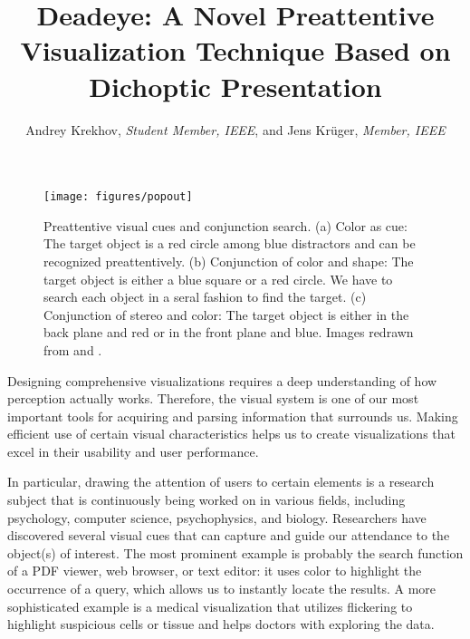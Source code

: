\documentclass[journal]{vgtc}                %
\title{Deadeye: A Novel Preattentive Visualization Technique Based on Dichoptic Presentation}
\author{Andrey Krekhov, \textit{Student Member, IEEE}, and Jens Kr\"uger, \textit{Member, IEEE}}
\begin{document}


\maketitle



\begin{figure*}[t!]
\centering
\texttt{[image: figures/popout]}
\caption{Preattentive visual cues and conjunction search. (a) Color as cue: The target object is a red circle among blue distractors and can be recognized preattentively. (b) Conjunction of color and shape: The target object is either a blue square or a red circle. We have to search each object in a seral fashion to find the target. (c) Conjunction of stereo and color: The target object is either in the back plane and red or in the front plane and blue. Images redrawn from \protect\cite{Healey:2012:AVM:2225054.2225226} and \protect\cite{nakayama1986serial}.}
\label{fig:popout}
\end{figure*}

Designing comprehensive visualizations requires a deep understanding of how perception actually works. Therefore, the visual system is one of our most important tools for acquiring and parsing information that surrounds us. Making efficient use of certain visual characteristics helps us to create visualizations that excel in their usability and user performance. 

In particular, drawing the attention of users to certain elements is a research subject that is continuously being worked on in various fields, including psychology, computer science, psychophysics, and biology. Researchers have discovered several visual cues that can capture and guide our attendance to the object(s) of interest. The most prominent example is probably the search function of a PDF viewer, web browser, or text editor: it uses color to highlight the occurrence of a query, which allows us to instantly locate the results. A more sophisticated example is a medical visualization that utilizes flickering to  highlight suspicious cells or tissue and helps doctors with exploring the data. 
\end{document}
